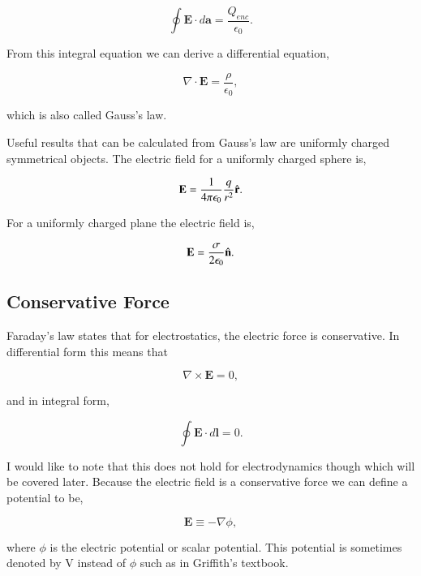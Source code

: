 \documentclass[preprint, review,12pt]{elsarticle}
\def\x{\times}
\def\.{\cdot}
\def\b{\textbf}
\def\={\equiv}
\def\div{\nabla \.}
\def\curl{\nabla \x}
\newcommand{\hb}[1]{\hat{\b #1}}
\begin{document}
\begin{equation}
    \oint \b{E}\. d\b{a} = \frac{Q_{enc}}{\epsilon_0}.
\end{equation}

From this integral equation we can derive a differential equation,

\begin{equation}
    \div \b{E} = \frac{\rho}{\epsilon_0},
\end{equation}

which is also called Gauss's law. 

Useful results that can be calculated from Gauss's law are uniformly charged symmetrical objects. The electric field for a uniformly charged sphere is,

\begin{equation}
    \b{E}= \frac{1}{4 \pi \epsilon_0} \frac{q}{r^2}\hb{r}.
\end{equation}

For a uniformly charged plane the electric field is,

\begin{equation}
    \b{E} = \frac{\sigma}{2\epsilon_0}\hb{n}.
\end{equation}

\subsection{Conservative Force}

Faraday's law states that for electrostatics, the electric force is conservative. In differential form this means that

\begin{equation}
    \curl \b{E} = 0,
\end{equation}

and in integral form,

\begin{equation}
    \oint \b{E} \. d\b{l} = 0.
\end{equation}

I would like to note that this does not hold for electrodynamics though which will be covered later. Because the electric field is a conservative force we can define a potential to be,

\begin{equation}
    \b{E} \= -\nabla \phi,
\end{equation}

where $\phi$ is the electric potential or scalar potential. This potential is sometimes denoted by V instead of $\phi$ such as in Griffith's textbook.
\end{document}
